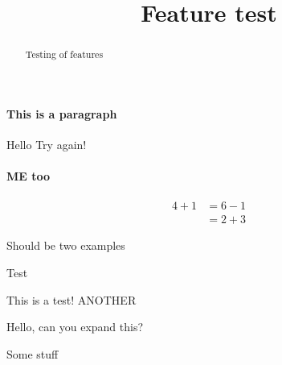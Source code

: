 \documentclass{ximera}
\title{Feature test}
\begin{document}
\begin{abstract}
    Testing of features
\end{abstract}
\maketitle

\paragraph{This is a paragraph}

\begin{problem}
  Hello Try again!

\paragraph{ME too}
\end{problem}
\begin{image}
\end{image}

\begin{align*}
  4+1 &= 6-1\\
  &= 2+3
\end{align*}


Should be two examples

\begin{solution}
\end{solution}

\be
Test
\ee

\begin{center}
\end{center}

This is a test! ANOTHER

\begin{theorem}
  Hello, can you expand this?
  \begin{expandable}
    Some stuff
  \end{expandable}
\end{theorem}
\end{document}
